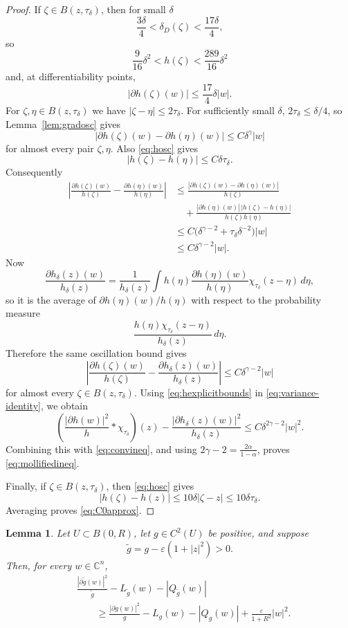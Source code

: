 \documentclass[12pt]{amsart}
\newtheorem{lemma}[theorem]{Lemma}
\newcommand{\C}{\mathbb C}
\begin{document}
\begin{proof}
If $\zeta\in B(z,\tau_\delta)$, then for small $\delta$
\[
 \frac{3\delta}{4}<\delta_D(\zeta)<\frac{17\delta}{4},
\]
so
\begin{equation}\label{eq:hexplicitbounds}
 \frac{9}{16}\delta^2<h(\zeta)<\frac{289}{16}\delta^2
\end{equation}
and, at differentiability points,
\[
 |\partial h(\zeta)(w)|\le\frac{17}{4}\delta|w|.
\]
For $\zeta,\eta\in B(z,\tau_\delta)$ we have
$|\zeta-\eta|\le2\tau_\delta$. For sufficiently small $\delta$,
$2\tau_\delta\le\delta/4$, so Lemma~\ref{lem:gradosc} gives
\[
 |\partial h(\zeta)(w)-\partial h(\eta)(w)|
 \le C\delta^\gamma|w|
\]
for almost every pair $\zeta,\eta$. Also
\eqref{eq:hosc} gives
\[
 |h(\zeta)-h(\eta)|\le C\delta\tau_\delta.
\]
Consequently
\begin{align*}
 \left|
 \frac{\partial h(\zeta)(w)}{h(\zeta)}
 -\frac{\partial h(\eta)(w)}{h(\eta)}
 \right|
 &\le
 \frac{|\partial h(\zeta)(w)-\partial h(\eta)(w)|}{h(\zeta)}\\
 &\quad+
 \frac{|\partial h(\eta)(w)|\,|h(\zeta)-h(\eta)|}
 {h(\zeta)h(\eta)}\\
 &\le C\bigl(\delta^{\gamma-2}+\tau_\delta\delta^{-2}\bigr)|w|\\
 &\le C\delta^{\gamma-2}|w|.
\end{align*}
Now
\[
 \frac{\partial h_\delta(z)(w)}{h_\delta(z)}
 =\frac{1}{h_\delta(z)}
 \int h(\eta)\frac{\partial h(\eta)(w)}{h(\eta)}
 \chi_{\tau_\delta}(z-\eta)\,d\eta,
\]
so it is the average of $\partial h(\eta)(w)/h(\eta)$ with respect to the
probability measure
\[
 \frac{h(\eta)\chi_{\tau_\delta}(z-\eta)}{h_\delta(z)}\,d\eta.
\]
Therefore the same oscillation bound gives
\[
 \left|
 \frac{\partial h(\zeta)(w)}{h(\zeta)}
 -\frac{\partial h_\delta(z)(w)}{h_\delta(z)}
 \right|
 \le C\delta^{\gamma-2}|w|
\]
for almost every $\zeta\in B(z,\tau_\delta)$. Using
\eqref{eq:hexplicitbounds} in \eqref{eq:variance-identity}, we obtain
\[
 \left(\frac{|\partial h(w)|^2}{h}*\chi_{\tau_\delta}\right)(z)
 -\frac{|\partial h_\delta(z)(w)|^2}{h_\delta(z)}
 \le C\delta^{2\gamma-2}|w|^2.
\]
Combining this with \eqref{eq:convineq}, and using
$2\gamma-2=\frac{2\alpha}{1-\alpha}$, proves
\eqref{eq:mollifiedineq}.

Finally, if $\zeta\in B(z,\tau_\delta)$, then \eqref{eq:hosc} gives
\[
 |h(\zeta)-h(z)|\le10\delta|\zeta-z|\le10\delta\tau_\delta.
\]
Averaging proves \eqref{eq:C0approx}.
\end{proof}

\begin{lemma}\label{lem:strictification}
Let $U\subset B(0,R)$, let $g\in C^2(U)$ be positive, and suppose
\[
 \widetilde g=g-\varepsilon(1+|z|^2)>0.
\]
Then, for every $w\in\C^n$,
\begin{align}\label{eq:strictification}
 &\frac{|\partial\widetilde g(w)|^2}{\widetilde g}
 -L_{\widetilde g}(w)-|Q_{\widetilde g}(w)|\\
 &\qquad\ge
 \frac{|\partial g(w)|^2}{g}-L_g(w)-|Q_g(w)|
 +\frac{\varepsilon}{1+R^2}|w|^2.\nonumber
\end{align}
\end{lemma}
\end{document}
